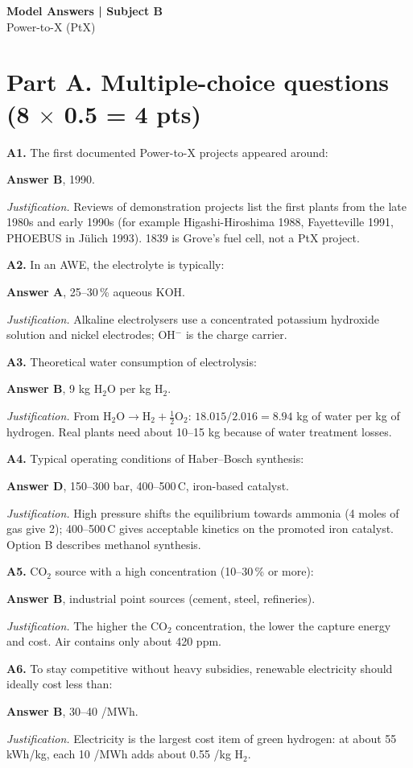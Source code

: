 \documentclass[11pt,a4paper]{article}
\newcommand{\degC}{\,\textdegree C}
\newcommand{\q}[2]{\par\medskip\textbf{#1.} #2\par}
\newcommand{\answer}[2]{\textcolor{ans}{\textbf{Answer #1}}, #2\par}
\newcommand{\why}[1]{\textit{Justification.} #1\par}
\newcommand{\pts}[1]{\hfill{\normalsize\textbf{(#1)}}}
\begin{document}
\clearpage
\begin{center}
{\LARGE\bfseries Model Answers | Subject B}\\[3pt]
{\large Power-to-X (PtX)}
\end{center}

\section{Part A. Multiple-choice questions \pts{8 $\times$ 0.5 = 4 pts}}

\q{A1}{The first documented Power-to-X projects appeared around:}
\answer{B}{1990.}
\why{Reviews of demonstration projects list the first plants from the late 1980s and early 1990s (for example
Higashi-Hiroshima 1988, Fayetteville 1991, PHOEBUS in Jülich 1993). 1839 is Grove's fuel cell, not a PtX project.}

\q{A2}{In an AWE, the electrolyte is typically:}
\answer{A}{25--30\,\% aqueous KOH.}
\why{Alkaline electrolysers use a concentrated potassium hydroxide solution and nickel electrodes; OH$^-$ is the
charge carrier.}

\q{A3}{Theoretical water consumption of electrolysis:}
\answer{B}{9 kg H$_2$O per kg H$_2$.}
\why{From $\mathrm{H_2O \rightarrow H_2 + \tfrac{1}{2}O_2}$: $18.015/2.016 = 8.94$ kg of water per kg of hydrogen.
Real plants need about 10--15 kg because of water treatment losses.}

\q{A4}{Typical operating conditions of Haber--Bosch synthesis:}
\answer{D}{150--300 bar, 400--500\degC, iron-based catalyst.}
\why{High pressure shifts the equilibrium towards ammonia (4 moles of gas give 2); 400--500\degC{} gives acceptable
kinetics on the promoted iron catalyst. Option B describes methanol synthesis.}

\q{A5}{CO$_2$ source with a high concentration (10--30\,\% or more):}
\answer{B}{industrial point sources (cement, steel, refineries).}
\why{The higher the CO$_2$ concentration, the lower the capture energy and cost. Air contains only about 420 ppm.}

\q{A6}{To stay competitive without heavy subsidies, renewable electricity should ideally cost less than:}
\answer{B}{30--40 \texteuro/MWh.}
\why{Electricity is the largest cost item of green hydrogen: at about 55 kWh/kg, each 10 \texteuro/MWh adds about
0.55 \texteuro/kg H$_2$.}
\end{document}
